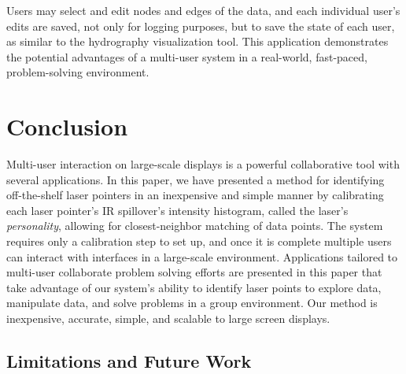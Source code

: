 \documentclass[review]{vgtc}                 %
\begin{document}

Users may select and edit nodes and edges of the data, and each individual user's edits are saved, not only for 
logging purposes, but to save the state of each user, as similar to the hydrography visualization tool. 
This application demonstrates the potential advantages of a multi-user system in a real-world, fast-paced, 
problem-solving environment.

\section{Conclusion}

Multi-user interaction on large-scale displays is a powerful
collaborative tool with several applications. In this paper, we have
presented a method for identifying off-the-shelf laser
pointers in an inexpensive and simple manner by calibrating each laser
pointer's IR spillover's intensity histogram, called the laser's
\emph{personality}, allowing for closest-neighbor matching of data
points. The system requires only a calibration step to set up, and
once it is complete multiple users can interact with interfaces in a
large-scale environment. Applications tailored to multi-user
collaborate problem solving efforts are presented in this paper that
take advantage of our system's ability to identify laser points to
explore data, manipulate data, and solve problems in a group
environment. Our method is inexpensive, accurate, simple, and scalable
to large screen displays.

\subsection{Limitations and Future Work}
\label{section:FutureWork}
\end{document}
